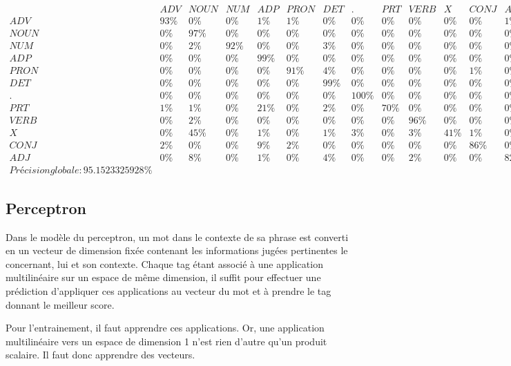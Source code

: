 \documentclass{article}
\begin{document}
$$
\begin{array}{l|c|c|c|c|c|c|c|c|c|c|c|c}
& ADV & NOUN & NUM & ADP & PRON & DET & . & PRT & VERB & X & CONJ & ADJ\\
ADV & 93\% & 0\% & 0\% & 1\% & 1\% & 0\% & 0\% & 0\% & 0\% & 0\% & 0\% & 1\%\\
NOUN & 0\% & 97\% & 0\% & 0\% & 0\% & 0\% & 0\% & 0\% & 0\% & 0\% & 0\% & 0\%\\
NUM & 0\% & 2\% & 92\% & 0\% & 0\% & 3\% & 0\% & 0\% & 0\% & 0\% & 0\% & 0\%\\
ADP & 0\% & 0\% & 0\% & 99\% & 0\% & 0\% & 0\% & 0\% & 0\% & 0\% & 0\% & 0\%\\
PRON & 0\% & 0\% & 0\% & 0\% & 91\% & 4\% & 0\% & 0\% & 0\% & 0\% & 1\% & 0\%\\
DET & 0\% & 0\% & 0\% & 0\% & 0\% & 99\% & 0\% & 0\% & 0\% & 0\% & 0\% & 0\%\\
. & 0\% & 0\% & 0\% & 0\% & 0\% & 0\% & 100\% & 0\% & 0\% & 0\% & 0\% & 0\%\\
PRT & 1\% & 1\% & 0\% & 21\% & 0\% & 2\% & 0\% & 70\% & 0\% & 0\% & 0\% & 0\%\\
VERB & 0\% & 2\% & 0\% & 0\% & 0\% & 0\% & 0\% & 0\% & 96\% & 0\% & 0\% & 0\%\\
X & 0\% & 45\% & 0\% & 1\% & 0\% & 1\% & 3\% & 0\% & 3\% & 41\% & 1\% & 0\%\\
CONJ & 2\% & 0\% & 0\% & 9\% & 2\% & 0\% & 0\% & 0\% & 0\% & 0\% & 86\% & 0\%\\
ADJ & 0\% & 8\% & 0\% & 1\% & 0\% & 4\% & 0\% & 0\% & 2\% & 0\% & 0\% & 82\%\\

Précision globale : 95.1523325928\% 
\end{array}
$$

\subsection{Perceptron}

Dans le modèle du perceptron, un mot dans le contexte de sa phrase est converti en un vecteur de dimension fixée contenant les informations jugées pertinentes le concernant, lui et son contexte. Chaque tag étant associé à une application multilinéaire sur un espace de même dimension, il suffit pour effectuer une prédiction d'appliquer ces applications au vecteur du mot et à prendre le tag donnant le meilleur score.

Pour l'entrainement, il faut apprendre ces applications. Or, une application multilinéaire vers un espace de dimension 1 n'est rien d'autre qu'un produit scalaire. Il faut donc apprendre des vecteurs.
\end{document}
